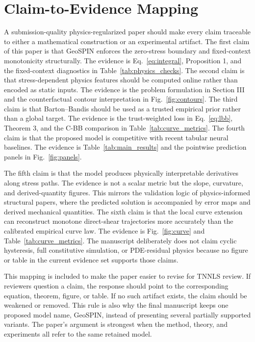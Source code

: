 \documentclass[journal]{IEEEtran}
\begin{document}
\section{Claim-to-Evidence Mapping}
A submission-quality physics-regularized paper should make every claim traceable to either a mathematical construction or an experimental artifact. The first claim of this paper is that GeoSPIN enforces the zero-stress boundary and fixed-context monotonicity structurally. The evidence is Eq.~\eqref{eq:integral}, Proposition 1, and the fixed-context diagnostics in Table~\ref{tab:physics_checks}. The second claim is that stress-dependent physics features should be computed online rather than encoded as static inputs. The evidence is the problem formulation in Section III and the counterfactual contour interpretation in Fig.~\ref{fig:contours}. The third claim is that Barton--Bandis should be used as a trusted empirical prior rather than a global target. The evidence is the trust-weighted loss in Eq.~\eqref{eq:lbb}, Theorem 3, and the C-BB comparison in Table~\ref{tab:curve_metrics}. The fourth claim is that the proposed model is competitive with recent tabular neural baselines. The evidence is Table~\ref{tab:main_results} and the pointwise prediction panels in Fig.~\ref{fig:panels}.

The fifth claim is that the model produces physically interpretable derivatives along stress paths. The evidence is not a scalar metric but the slope, curvature, and derived-quantity figures. This mirrors the validation logic of physics-informed structural papers, where the predicted solution is accompanied by error maps and derived mechanical quantities. The sixth claim is that the local curve extension can reconstruct monotone direct-shear trajectories more accurately than the calibrated empirical curve law. The evidence is Fig.~\ref{fig:curve} and Table~\ref{tab:curve_metrics}. The manuscript deliberately does not claim cyclic hysteresis, full constitutive simulation, or PDE-residual physics because no figure or table in the current evidence set supports those claims.

This mapping is included to make the paper easier to revise for TNNLS review. If reviewers question a claim, the response should point to the corresponding equation, theorem, figure, or table. If no such artifact exists, the claim should be weakened or removed. This rule is also why the final manuscript keeps one proposed model name, GeoSPIN, instead of presenting several partially supported variants. The paper's argument is strongest when the method, theory, and experiments all refer to the same retained model.
\end{document}
